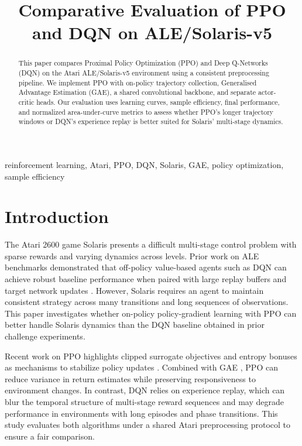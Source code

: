 \documentclass[conference]{IEEEtran}
\begin{document}
\title{Comparative Evaluation of PPO and DQN on ALE/Solaris-v5}

\author{%
}

\maketitle

\begin{abstract}
This paper compares Proximal Policy Optimization (PPO) and Deep Q-Networks (DQN) on the Atari ALE/Solaris-v5 environment using a consistent preprocessing pipeline. We implement PPO with on-policy trajectory collection, Generalised Advantage Estimation (GAE), a shared convolutional backbone, and separate actor-critic heads. Our evaluation uses learning curves, sample efficiency, final performance, and normalized area-under-curve metrics to assess whether PPO's longer trajectory windows or DQN's experience replay is better suited for Solaris' multi-stage dynamics.
\end{abstract}

\begin{IEEEkeywords}
reinforcement learning, Atari, PPO, DQN, Solaris, GAE, policy optimization, sample efficiency
\end{IEEEkeywords}

\section{Introduction}
The Atari 2600 game Solaris presents a difficult multi-stage control problem with sparse rewards and varying dynamics across levels. Prior work on ALE benchmarks demonstrated that off-policy value-based agents such as DQN can achieve robust baseline performance when paired with large replay buffers and target network updates \cite{mnih2015human}. However, Solaris requires an agent to maintain consistent strategy across many transitions and long sequences of observations. This paper investigates whether on-policy policy-gradient learning with PPO can better handle Solaris dynamics than the DQN baseline obtained in prior challenge experiments.

Recent work on PPO highlights clipped surrogate objectives and entropy bonuses as mechanisms to stabilize policy updates \cite{schulman2017proximal}. Combined with GAE \cite{schulman2016high}, PPO can reduce variance in return estimates while preserving responsiveness to environment changes. In contrast, DQN relies on experience replay, which can blur the temporal structure of multi-stage reward sequences and may degrade performance in environments with long episodes and phase transitions. This study evaluates both algorithms under a shared Atari preprocessing protocol to ensure a fair comparison.
\end{document}

